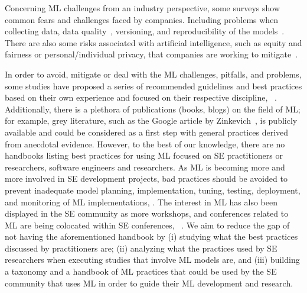 Concerning ML challenges from an industry perspective, some surveys show common fears and challenges faced by companies.  Including problems  when collecting data\cite{creg_baker_2019}, data quality~\cite{creg_baker_2019}, versioning, and reproducibility of the models~\cite{thormundsson_2022}.  There are also some risks associated with artificial intelligence, such as equity and fairness or personal/individual privacy, that companies are working to mitigate~\cite{chui_hall_mayhew_singla_2022}.

In order to avoid, mitigate  or deal with the  ML challenges, pitfalls, and problems, some studies have proposed a series of recommended guidelines  and best practices based on their own experience and focused on their respective discipline, \eg~\cite{biderman2020pitfalls, MichaelLones2021, halilaj2018machine}. Additionally, there is a plethora of publications (\eg books, blogs) on the field of ML; for example, grey literature, such as the Google  article by Zinkevich~\cite{zinkevich_2021}, is  publicly available and could be considered as a first step with general practices derived from anecdotal evidence. However,  to the best of our knowledge, there are no handbooks listing best practices for using ML focused on SE practitioners or researchers, \ie software engineers and researchers. As ML is becoming more and more involved in SE development projects, bad practices should be avoided to prevent inadequate model planning, implementation, tuning, testing, deployment, and monitoring of ML implementations, \eg \cite{ LewisGrace2021WAIN, amershi2019software}.  The interest in ML has also been displayed in the SE community as more workshops, and conferences related to ML are being colocated within SE conferences, \eg~\cite{furlinger_2023, cain_2022, icse_2022, A2C2_2022, MaLTeSQuE_2022, EASEAI_2022}.  We aim to  reduce the gap of not having the aforementioned handbook by (i) studying what the best practices discussed by practitioners are; (ii) analyzing what  the practices used by SE researchers when executing studies that involve ML  models are, and (iii) building a taxonomy and a handbook of ML practices that could be used by the SE community that uses ML in order to guide their ML development and research.


